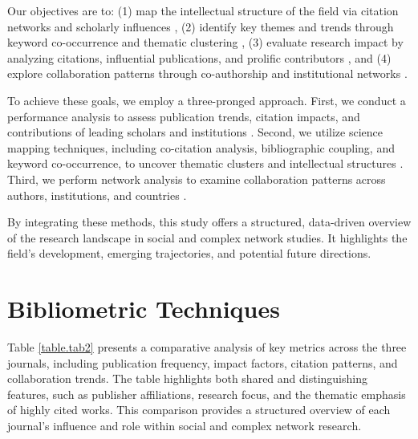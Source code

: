 \documentclass[twocolumn]{article}
\begin{document}
	Our objectives are to: (1) map the intellectual structure of the field via citation networks and scholarly influences \cite{small1973co}, (2) identify key themes and trends through keyword co-occurrence and thematic clustering \cite{callon1983co}, (3) evaluate research impact by analyzing citations, influential publications, and prolific contributors \cite{garfield1979citation}, and (4) explore collaboration patterns through co-authorship and institutional networks \cite{glanzel2004coauthorship}.
	
	To achieve these goals, we employ a three-pronged approach. First, we conduct a performance analysis to assess publication trends, citation impacts, and contributions of leading scholars and institutions \cite{bornmann2011citation}. Second, we utilize science mapping techniques, including co-citation analysis, bibliographic coupling, and keyword co-occurrence, to uncover thematic clusters and intellectual structures \cite{van2010visualizing,chen2017citespace}. Third, we perform network analysis to examine collaboration patterns across authors, institutions, and countries \cite{newman2004coauthorship, moody2004sociology}.
	
	By integrating these methods, this study offers a structured, data-driven overview of the research landscape in social and complex network studies. It highlights the field's development, emerging trajectories, and potential future directions.
	
	
	
	
	\section{Bibliometric Techniques}\label{Bibliometric Techniques}
	
	Table \ref{table.tab2} presents a comparative analysis of key metrics across the three journals, including publication frequency, impact factors, citation patterns, and collaboration trends\cite{donthu2021bibliometric}. The table highlights both shared and distinguishing features, such as publisher affiliations, research focus, and the thematic emphasis of highly cited works. This comparison provides a structured overview of each journal’s influence and role within social and complex network research\cite{ WOS:000356343600002}.
	
\end{document}
